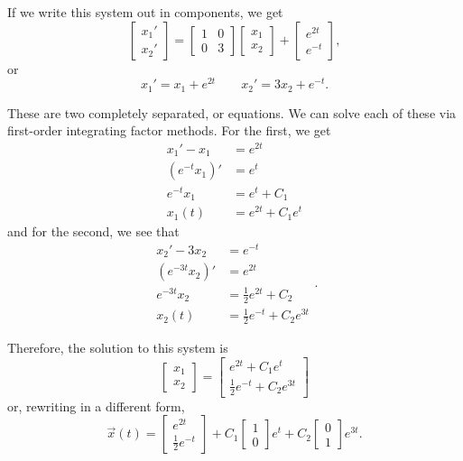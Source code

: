 \begin{exampleSol}
If we write this system out in components, we get 
\[ \begin{bmatrix} x_1' \\ x_2' \end{bmatrix} = \begin{bmatrix}1& 0 \\ 0 & 3 \end{bmatrix}\begin{bmatrix} x_1 \\ x_2 \end{bmatrix} + \begin{bmatrix} e^{2t} \\ e^{-t} \end{bmatrix}, \] or 
\[ x_1' = x_1 + e^{2t} \qquad x_2' = 3x_2 + e^{-t}.\]

These are two completely separated, or \emph{} equations. We can solve each of these via first-order integrating factor methods. For the first, we get
\[
\begin{split}
x_1' - x_1 &= e^{2t} \\
(e^{-t}x_1)' &= e^{t} \\
e^{-t}x_1 &= e^t + C_1 \\
x_1(t) &= e^{2t} + C_1e^t
\end{split}
\]
and for the second, we see that
\[
\begin{split}
x_2' - 3x_2 &= e^{-t} \\
(e^{-3t}x_2)' &= e^{2t} \\
e^{-3t}x_2 &= \frac{1}{2}e^{2t} + C_2 \\
x_2(t) &= \frac{1}{2}e^{-t} + C_2e^{3t}
\end{split}.
\]

Therefore, the solution to this system is
\[ \begin{bmatrix} x_1 \\ x_2 \end{bmatrix} = \begin{bmatrix}e^{2t} + C_1e^t \\ \frac{1}{2}e^{-t} + C_2e^{3t} \end{bmatrix} \] or, rewriting in a different form,
\[ \vec{x}(t) = \begin{bmatrix} e^{2t} \\ \frac{1}{2}e^{-t} \end{bmatrix} + C_1 \begin{bmatrix} 1 \\ 0 \end{bmatrix} e^{t} + C_2 \begin{bmatrix} 0 \\ 1 \end{bmatrix} e^{3t}.\]
\end{exampleSol}


